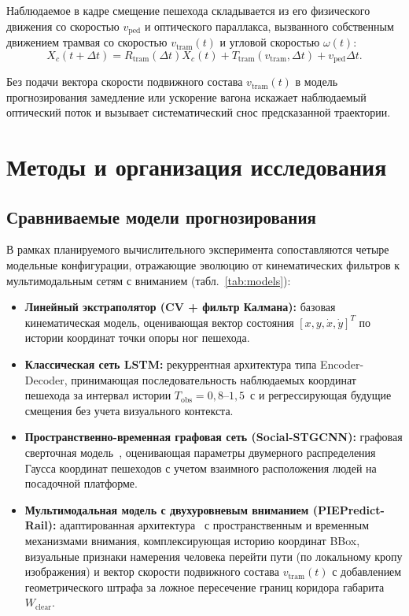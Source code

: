 \documentclass{misisarticle}
\begin{document}
Наблюдаемое в кадре смещение пешехода складывается из его физического движения со скоростью $v_{\text{ped}}$ и оптического параллакса, вызванного собственным движением трамвая со скоростью $v_{\text{tram}}(t)$ и угловой скоростью $\omega(t)$:
\begin{equation}
  X_c(t + \Delta t) = R_{\text{tram}}(\Delta t) X_c(t) + T_{\text{tram}}(v_{\text{tram}}, \Delta t) + v_{\text{ped}} \Delta t.
  \label{eq:parallax}
\end{equation}

Без подачи вектора скорости подвижного состава $v_{\text{tram}}(t)$ в модель прогнозирования замедление или ускорение вагона искажает наблюдаемый оптический поток и вызывает систематический снос предсказанной траектории.

\section{Методы и организация исследования}

\subsection{Сравниваемые модели прогнозирования}

В рамках планируемого вычислительного эксперимента сопоставляются четыре модельные конфигурации, отражающие эволюцию от кинематических фильтров к мультимодальным сетям с вниманием (табл.~\ref{tab:models}):
\begin{itemize}
  \item \textbf{Линейный экстраполятор (CV + фильтр Калмана):} базовая кинематическая модель, оценивающая вектор состояния $[x, y, \dot{x}, \dot{y}]^T$ по истории координат точки опоры ног пешехода.
  \item \textbf{Классическая сеть LSTM:} рекуррентная архитектура типа Encoder-Decoder, принимающая последовательность наблюдаемых координат пешехода за интервал истории $T_{\text{obs}} = 0{,}8$--$1{,}5$~с и регрессирующая будущие смещения без учета визуального контекста.
  \item \textbf{Пространственно-временная графовая сеть (Social-STGCNN):} графовая сверточная модель~\cite{mohamed2020}, оценивающая параметры двумерного распределения Гаусса координат пешеходов с учетом взаимного расположения людей на посадочной платформе.
  \item \textbf{Мультимодальная модель с двухуровневым вниманием (PIEPredict-Rail):} адаптированная архитектура~\cite{rasouli2019} с пространственным и временным механизмами внимания, комплексирующая историю координат BBox, визуальные признаки намерения человека перейти пути (по локальному кропу изображения) и вектор скорости подвижного состава $v_{\text{tram}}(t)$ с добавлением геометрического штрафа за ложное пересечение границ коридора габарита $W_{\text{clear}}$.
\end{itemize}
\end{document}
